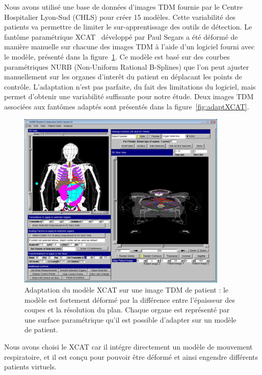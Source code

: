 Nous avons utilisé une base de données d’images TDM fournie par le Centre Hospitalier Lyon-Sud (CHLS) pour créer 15 modèles. Cette variabilité des patients va permettre de limiter le sur-apprentissage des outils de détection. Le fantôme paramétrique XCAT~\cite{segars2009mcatoverview} développé par Paul Segars a été déformé de manière manuelle sur chacune des images TDM à l’aide d’un logiciel fourni avec le modèle, présenté dans la figure~\ref{fig:fitXCAT}. Ce modèle est basé sur des courbes paramétriques NURB (Non-Uniform Rational B-Splines) que l'on peut ajuster manuellement sur les organes d'interêt du patient en déplacant les points de contrôle. L'adaptation n’est pas parfaite, du fait des limitations du logiciel, mais permet d’obtenir une variabilité suffisante pour notre étude. Deux images TDM associées aux fantômes adaptés sont présentés dans la figure~\ref{fig:adaptXCAT}.

\begin{figure}
 \centering
 \includegraphics[width=10cm]{images/FIT_XCAT}
 \caption[Adaptation du modèle XCAT sur une image TDM de patient]{Adaptation du modèle XCAT sur une image TDM de patient : le modèle est fortement déformé par la différence entre l'épaisseur des coupes et la résolution du plan. Chaque organe est représenté par une surface paramétrique qu’il est possible d’adapter sur un modèle de patient.}
 \label{fig:fitXCAT}
\end{figure}

Nous avons choisi le XCAT car il intégre directement un modèle de mouvement respiratoire, et il est conçu pour pouvoir être déformé et ainsi engendre différents patients virtuels.

